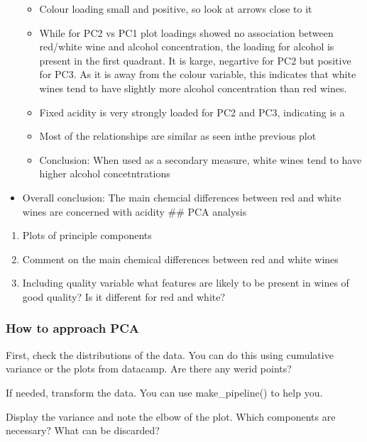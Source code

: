 \documentclass[
]{article}
\providecommand{\tightlist}{%
  \setlength{\itemsep}{0pt}\setlength{\parskip}{0pt}}
\begin{document}
\begin{itemize}
  \begin{itemize}
  \tightlist
  \item
    Colour loading small and positive, so look at arrows close to it
  \item
    While for PC2 vs PC1 plot loadings showed no association between
    red/white wine and alcohol concentration, the loading for alcohol is
    present in the first quadrant. It is karge, negartive for PC2 but
    positive for PC3. As it is away from the colour variable, this
    indicates that white wines tend to have slightly more alcohol
    concentration than red wines.
  \item
    Fixed acidity is very strongly loaded for PC2 and PC3, indicating is
    a
  \item
    Most of the relationships are similar as seen inthe previous plot
  \item
    Conclusion: When used as a secondary measure, white wines tend to
    have higher alcohol concetntrations
  \end{itemize}
\item
  Overall conclusion: The main chemcial differences between red and
  white wines are concerned with acidity \#\# PCA analysis
\end{itemize}

\begin{enumerate}
\def\labelenumi{\arabic{enumi}.}
\tightlist
\item
  Plots of principle components
\item
  Comment on the main chemical differences between red and white wines
\item
  Including quality variable what features are likely to be present in
  wines of good quality? Is it different for red and white?
\end{enumerate}

\subsubsection{How to approach PCA}\label{how-to-approach-pca}

First, check the distributions of the data. You can do this using
cumulative variance or the plots from datacamp. Are there any werid
points?

If needed, transform the data. You can use make\_pipeline() to help you.

Display the variance and note the elbow of the plot. Which components
are necessary? What can be discarded?
\end{document}
